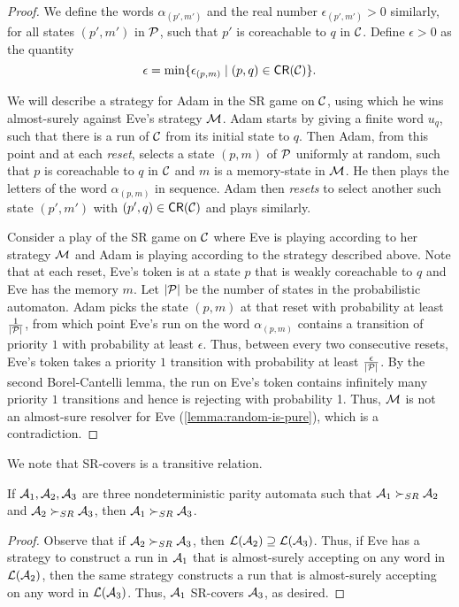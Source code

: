 \begin{proof}
We define the words $\alpha_{(p',m')}$ and the real number $\epsilon_{(p',m')}>0$ similarly, for all states $(p',m')$ in $\mathcal{P}$, such that $p'$ is coreachable to $q$ in $\mathcal{C}$. Define $\epsilon>0$ as the quantity $$\epsilon=\min\{\epsilon_{(p,m)}\mid (p,q) \in {\mathsf{CR}}(\mathcal{C}) \}.$$  

We will describe a strategy for Adam in the SR game on $\mathcal{C}$, using which he wins almost-surely against Eve's strategy $\mathcal{M}$. Adam starts by giving a finite word $u_q$, such that there is a run of $\mathcal{C}$ from its  initial state to $q$. Then Adam, from this point and at each \emph{reset}, selects a state $(p,m)$ of $\mathcal{P}$ uniformly at random, such that $p$ is coreachable to $q$ in $\mathcal{C}$ and $m$ is a memory-state in $\mathcal{M}$. He then plays the letters of the word $\alpha_{(p,m)}$ in sequence. Adam then \emph{resets} to select another such state $(p',m')$ with $(p',q) \in {\mathsf{CR}}(\mathcal{C})$ and plays similarly. 

Consider a play of the SR game on $\mathcal{C}$ where Eve is playing according to her strategy $\mathcal{M}$ and Adam is playing according to the strategy described above. Note that at each reset, Eve's token is at a state $p$ that is weakly coreachable to $q$ and Eve has the memory $m$. Let $\lvert\mathcal{P}\rvert$ be the number of states in the probabilistic automaton. Adam picks the state $(p,m)$ at that reset with probability at least $\frac{1}{\lvert \mathcal{P} \rvert}$, from which point Eve's run on the word $\alpha_{(p,m)}$ contains a transition of priority $1$ with probability at least $\epsilon$. Thus, between every two consecutive resets, Eve's token takes a priority $1$ transition with probability at least $\frac{\epsilon}{\lvert \mathcal{P} \rvert}$. By the second Borel-Cantelli lemma, the run on Eve's token contains infinitely many priority $1$ transitions and hence is rejecting with probability 1. Thus, $\mathcal{M}$ is not an almost-sure resolver for Eve (\cref{lemma:random-is-pure}), which is a contradiction.  
\end{proof}

We note that SR-covers is a transitive relation.
\begin{lemma}\label{lemma:sr-cover-transitivity}
If $\mathcal{A}_1,\mathcal{A}_2,\mathcal{A}_3$ are three nondeterministic parity automata such that  $\mathcal{A}_1 \succ_{SR} \mathcal{A}_2$ and $\mathcal{A}_2 \succ_{SR} \mathcal{A}_3$, then $\mathcal{A}_1 \succ_{SR} \mathcal{A}_3$.
\end{lemma}
\begin{proof}
    Observe that if $\mathcal{A}_2 \succ_{SR} \mathcal{A}_3$, then $\mathcal{L}(\mathcal{A}_2) \supseteq \mathcal{L}(\mathcal{A}_3)$. Thus, if Eve has a strategy to construct a run in $\mathcal{A}_1$ that is almost-surely accepting on any word in $\mathcal{L}(\mathcal{A}_2)$, then the same strategy constructs a run that is almost-surely accepting on any word in $\mathcal{L}(\mathcal{A}_3)$. Thus, $\mathcal{A}_1$ SR-covers $\mathcal{A}_3$, as desired. 
\end{proof}

